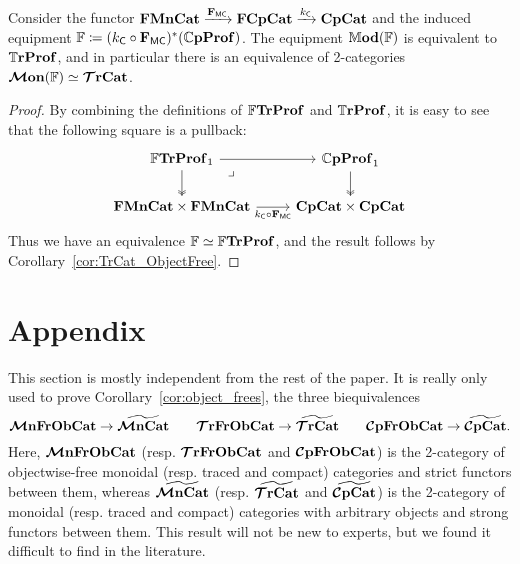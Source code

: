 \documentclass[11pt,oneside,article]{memoir}
\begin{document}
\begin{proposition}
  Consider the functor $\mathbf{FMnCat}\xrightarrow{\mathbf{F}_{\mathsf{MC}}}\mathbf{FCpCat}\xrightarrow{k_{\mathsf{C}}}\mathbf{CpCat}$ and the induced
  equipment $\mathbb{F}\coloneqq(k_{\mathsf{C}}\circ\mathbf{F}_{\mathsf{MC}})^*(\mathbb{C}\mathbf{pProf})$. The equipment
  $\mathbb{M}\mathbf{od}(\mathbb{F})$ is equivalent to $\mathbb{T}\mathbf{rProf}$, and in particular there is an equivalence of
  2-categories $\bm{\mathcal{M}}\mathbf{on}(\mathbb{F})\simeq\bm{\mathcal{T}}\mathbf{rCat}$.
\end{proposition}
\begin{proof}
  By combining the definitions of $\mathbb{F}\mathbf{TrProf}$ and $\mathbb{T}\mathbf{rProf}$, it is easy to see that the following
  square is a pullback:
  \begin{equation} \begin{tikzcd}
      \label{eqn:FTrProf_pullback}
    \dFrTrProf_1 \ar[r] \ar[d,two heads] \ar[dr,phantom,"\lrcorner" very near start]
      & \dCompProf_1 \ar[d,two heads] \\
    \FrMonCat\times\FrMonCat \ar[r,"k_{\MTCfont{C}}\circ\FMC"']
      & \CompCat\times\CompCat
  \end{tikzcd} \end{equation}
  Thus we have an equivalence $\mathbb{F}\simeq\mathbb{F}\mathbf{TrProf}$, and the result follows by
  Corollary~\ref{cor:TrCat_ObjectFree}.
\end{proof}

\appendix
\chapter{Appendix}
  \label{appendix}
{}

This section is mostly independent from the rest of the paper. It is really only used to prove
Corollary~\ref{cor:object_frees}, the three biequivalences
\[
  \bm{\mathcal{M}}\mathbf{nFrObCat} \to \widetilde{\bm{\mathcal{M}}\mathbf{nCat}} \qquad
  \bm{\mathcal{T}}\mathbf{rFrObCat} \to \widetilde{\bm{\mathcal{T}}\mathbf{rCat}} \qquad
  \bm{\mathcal{C}}\mathbf{pFrObCat} \to \widetilde{\bm{\mathcal{C}}\mathbf{pCat}}.
\]
Here, $\bm{\mathcal{M}}\mathbf{nFrObCat}$ (resp. $\bm{\mathcal{T}}\mathbf{rFrObCat}$ and $\bm{\mathcal{C}}\mathbf{pFrObCat}$) is the 2-category of objectwise-free
monoidal (resp. traced and compact) categories and strict functors between them, whereas
$\widetilde{\bm{\mathcal{M}}\mathbf{nCat}}$ (resp. $\widetilde{\bm{\mathcal{T}}\mathbf{rCat}}$ and $\widetilde{\bm{\mathcal{C}}\mathbf{pCat}}$) is the 2-category of monoidal (resp.
traced and compact) categories with arbitrary objects and strong functors between them. This result
will not be new to experts, but we found it difficult to find in the literature.
\end{document}
